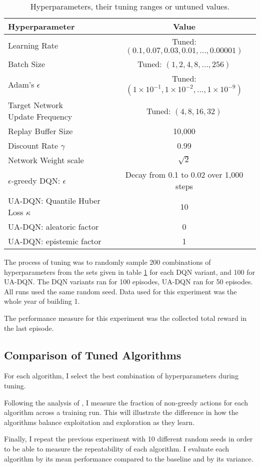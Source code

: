 \begin{table}
    \centering
    \caption{Hyperparameters, their tuning ranges or untuned values.}
    \label{tab:tuning}
    \begin{tabular}{l|c}
        Hyperparameter & Value \\ \hline
        Learning Rate  & Tuned:  $(0.1, 0.07, 0.03, 0.01, \dots, 0.00001)$                               \\
        Batch Size     & Tuned: $(1,2,4,8,\dots ,256)$                             \\
        Adam's $\epsilon$ & Tuned: $(1\times 10^{-1}, 1\times 10^{-2}, \dots, 1\times 10^{-9})$                           \\
        \makecell[l]{Target Network \\ Update Frequency} & Tuned: $(4, 8, 16, 32)$ \\ \hline
        Replay Buffer Size & 10,000 \\
        Discount Rate $\gamma$ & 0.99 \\ %
        Network Weight scale & $\sqrt{2}$ \\
        $\epsilon$-greedy DQN: $\epsilon$ & Decay from 0.1 to 0.02 over 1,000 steps \\
        UA-DQN: Quantile Huber Loss $\kappa$ & 10 \\
        UA-DQN: aleatoric factor & 0 \\
        UA-DQN: epistemic factor & 1 \\
    \end{tabular}
\end{table}

The process of tuning was to randomly sample 200 combinations of hyperparameters from the sets given in table \ref{tab:tuning} for each DQN variant, and 100 for UA-DQN.
The DQN variants ran for 100 episodes, UA-DQN ran for 50 episodes.
All runs used the same random seed.
Data used for this experiment was the whole year of building 1.

The performance measure for this experiment was the collected total reward in the last episode.

\subsection{Comparison of Tuned Algorithms}
For each algorithm, I select the best combination of hyperparameters during tuning.

Following the analysis of \cite{clements2020EstimatingRiskUncertainty}, I measure the fraction of non-greedy actions for each algorithm across a training run.
This will illustrate the difference in how the algorithms balance exploitation and exploration as they learn.

Finally, I repeat the previous experiment with 10 different random seeds in order to be able to measure the repeatability of each algorithm.
I evaluate each algorithm by its mean performance compared to the baseline and by its variance.